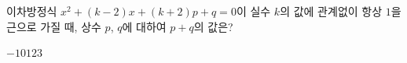 이차방정식 $x^2+(k-2)x+(k+2)p+q=0$이 실수 $k$의 값에 관계없이 항상 $1$을 근으로 가질 때, 상수 $p$, $q$에 대하여 $p+q$의 값은?
\begin{choices32}{$-1$}{$0$}{$1$}{$2$}{$3$}\end{choices32}
